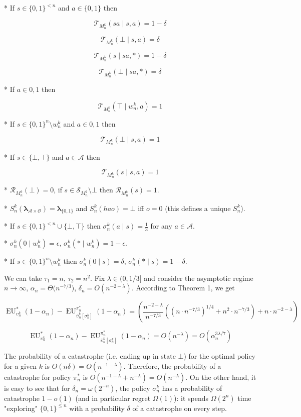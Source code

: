\documentclass[a4paper]{article}
\newcommand{\Bool}{\{0,1\}}
\newcommand{\AP}[1]{\left(#1\right)}
\newcommand{\AB}[1]{\left[#1\right]}
\newcommand{\Estr}{\boldsymbol{\lambda}}
\newcommand{\Ob}{\mathcal{O}}
\newcommand{\A}{\mathcal{A}}
\newcommand{\St}{\mathcal{S}}
\newcommand{\T}{\mathcal{T}}
\newcommand{\R}{\mathcal{R}}
\newcommand{\EU}{\operatorname{EU}}
\begin{document}
* If $s \in \Bool^{< n}$ and $a \in \Bool$ then 

$$\T_{M_n^k}(sa \mid s,a) = 1 - \delta$$

$$\T_{M_n^k}(\bot \mid s,a) = \delta$$

$$\T_{M_n^k}(s \mid sa,*) = 1 - \delta$$

$$\T_{M_n^k}(\bot \mid sa,*) = \delta$$

* If $a \in {0,1}$ then

$$\T_{M_n^k}(\top \mid w_n^k,a) = 1$$

* If $s \in \Bool^n \setminus w_n^k$ and $a \in {0,1}$ then

$$\T_{M_n^k}(\bot \mid s,a) = 1$$

* If $s \in \{\bot,\top\}$ and $a \in \A$ then

$$\T_{M_n^k}(s \mid s,a) = 1$$

* $\R_{M_n^k}(\bot)=0$, if $s \in \St_{M_n^k} \setminus \bot$ then $\R_{M_n^k}(s)=1$.

* $S_n^k(\Estr_{\A \times \Ob})=\Estr_{\Bool}$ and $S_n^k(hao)=\bot$ iff $o = 0$ (this defines a unique $S_n^k$).

* If $s \in \Bool^{<n} \cup \{\bot,\top\}$ then $\sigma_n^k(a \mid s) = \frac{1}{3}$ for any $a \in \A$.

* $\sigma_n^k(0 \mid w_n^k) = \epsilon$, $\sigma_n^k(* \mid w_n^k) = 1 - \epsilon$.

* If $s \in \Bool^n \setminus w_n^k$ then $\sigma_n^k(0 \mid s) = \delta$, $\sigma_n^k(* \mid s) = 1 - \delta$.

We can take $\tau_1 = n$, $\tau_2 = n^2$. Fix $\lambda \in (0,1/3]$ and consider the asymptotic regime $n \rightarrow \infty$, $\alpha_n = \Theta\Big(n^{-7/3}\Big)$, $\delta_n = O\AP{n^{-2-\lambda}}$. According to Theorem 1, we get

$$\EU_{\upsilon_n^k}^*(1-\alpha_n) - \EU_{\bar{\upsilon}_n^k\AB{\sigma_n^k}}^{\pi_n^*}(1-\alpha_n) = \AP{\frac{n^{-2-\lambda}}{n^{-7/3}}\AP{\AP{n \cdot n^{-7/3}}^{1/4}+n^2 \cdot n^{-7/3}}+n \cdot n^{-2-\lambda}}$$

$$\EU_{\upsilon_n^k}^*(1-\alpha_n) - \EU_{\bar{\upsilon}_n^k\AB{\sigma_n^k}}^{\pi_n^*}(1-\alpha_n) = O\AP{n^{-\lambda}}=O\AP{\alpha_n^{3\lambda/7}}$$

The probability of a catastrophe (i.e. ending up in state $\bot$) for the optimal policy for a given $k$ is $O\AP{n\delta}=O\AP{n^{-1-\lambda}}$. Therefore, the probability of a catastrophe for policy $\pi_n^*$ is $O\AP{n^{-1-\lambda}+n^{-\lambda}}=O\AP{n^{-\lambda}}$. On the other hand, it is easy to see that for $\delta_n = \omega\AP{2^{-n}}$, the policy $\sigma_n^k$ has a probability of catastrophe $1-o(1)$ (and in particular  regret $\Omega(1)$): it spends $\Omega(2^n)$ time "exploring" $\Bool^{\leq n}$ with a probability $\delta$ of a catastrophe on every step.
\end{document}
